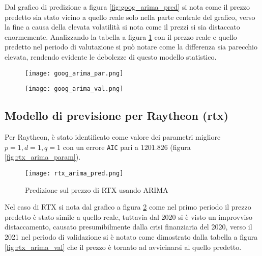Dal grafico di predizione a figura \ref{fig:goog_arima_pred} si nota come il prezzo predetto sia stato vicino a quello reale solo nella parte centrale del grafico, verso la fine a causa della elevata volatilità si nota
come il prezzi si sia distaccato enormemente.
Analizzando la tabella a figura \ref{fig:goog_arima_val} con il prezzo reale e quello predetto nel periodo di valutazione si può notare come la differenza sia parecchio elevata, rendendo evidente le debolezze di questo modello statistico.

\begin{figure}[ht]
    \centering
    \begin{minipage}{.5\textwidth}
        \centering
        \vspace{2cm}
        \texttt{[image: goog\_arima\_par.png]}
        \label{fig:goog_arima_param}
    \end{minipage}%
    \begin{minipage}{.5\textwidth}
        \centering
        \texttt{[image: goog\_arima\_val.png]}
        \label{fig:goog_arima_val}
    \end{minipage}
\end{figure}

\pagebreak

\subsection{Modello di previsione per Raytheon (rtx)}

Per Raytheon, è stato identificato come valore dei parametri migliore \(p=1, d=1, q=1\) con un errore \verb|AIC| pari a \(1201.826\) (figura \ref{fig:rtx_arima_param}).

\begin{figure}[ht]
    \centering
    \texttt{[image: rtx\_arima\_pred.png]}
    \caption{Predizione sul prezzo di RTX usando ARIMA}
    \label{fig:rtx_arima_pred}
\end{figure}

Nel caso di RTX si nota dal grafico a figura \ref{fig:rtx_arima_pred} come nel primo periodo il prezzo predetto è stato simile a quello reale, tuttavia dal 2020 si è visto un improvviso distaccamento,
causato presumibilmente dalla crisi finanziaria del 2020, verso il 2021 nel periodo di validazione si è notato come dimostrato dalla tabella a figura \ref{fig:rtx_arima_val} che il prezzo è tornato ad avvicinarsi al quello predetto.

